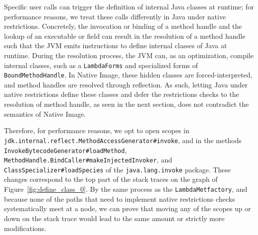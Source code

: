 Specific user calls can trigger the definition of internal Java classes at runtime; for performance reasons, we treat these calls differently in Java under native restrictions.
Concretely, the invocation or binding of a method handle and the lookup of an executable or field can result in the resolution of a method handle such that the JVM emits instructions to define internal classes of Java at runtime. During the resolution process, the JVM can, as an optimization, compile internal classes, such as a \verb|LambdaForms| and specialized forms of \verb|BoundMethodHandle|.
In Native Image, these hidden classes are forced-interpreted, and method handles are resolved through reflection. As such, letting Java under native restrictions define these classes and defer the restrictions checks to the resolution of method handle, as seen in the next section, does not contradict the semantics of Native Image. 

Therefore, for performance reasons, we opt to open scopes in \verb|jdk.internal.reflect.MethodAccessGenerator#invoke|, and in the methods \verb|InvokeBytecodeGenerator#loadMethod|, \verb|MethodHandle.BindCaller#makeInjectedInvoker|, and \verb|ClassSpecializer#loadSpecies| of the \verb|java.lang.invoke| package. These changes correspond to the top part of the stack traces on the graph of Figure~\ref{fig:define_class_0}. By the same process as the \verb|LambdaMetfactory|, and because none of the paths that need to implement native restrictions checks systematically meet at a node, we can prove that moving any of the scopes up or down on the stack trace would lead to the same amount or strictly more modifications.

